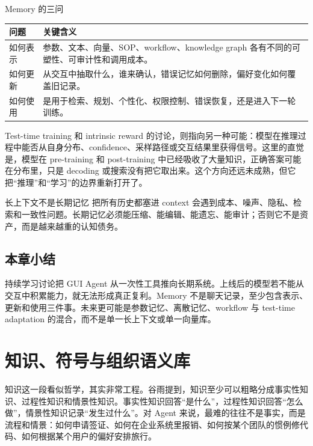 \documentclass[a4paper]{article}
\begin{document}
\begin{knowledgebox}{Memory 的三问}
\begin{tabularx}{\textwidth}{>{\raggedright\arraybackslash}p{} Y}
\toprule
问题 & 关键含义 \\
\midrule
如何表示 & 参数、文本、向量、SOP、workflow、knowledge graph 各有不同的可塑性、可审计性和调用成本。 \\
如何更新 & 从交互中抽取什么，谁来确认，错误记忆如何删除，偏好变化如何覆盖旧记录。 \\
如何使用 & 是用于检索、规划、个性化、权限控制、错误恢复，还是进入下一轮训练。 \\
\bottomrule
\end{tabularx}
\end{knowledgebox}

Test-time training 和 intrinsic reward 的讨论，则指向另一种可能：模型在推理过程中能否从自身分布、confidence、采样路径或交互结果里获得信号。这里的直觉是，模型在 pre-training 和 post-training 中已经吸收了大量知识，正确答案可能在分布里，只是 decoding 或搜索没有把它取出来。这个方向还远未成熟，但它把“推理”和“学习”的边界重新打开了。

\begin{warningbox}{长上下文不是长期记忆}
把所有历史都塞进 context 会遇到成本、噪声、隐私、检索和一致性问题。长期记忆必须能压缩、能编辑、能遗忘、能审计；否则它不是资产，而是越来越重的认知债务。
\end{warningbox}

\subsection{本章小结}

持续学习讨论把 GUI Agent 从一次性工具推向长期系统。上线后的模型若不能从交互中积累能力，就无法形成真正复利。Memory 不是聊天记录，至少包含表示、更新和使用三件事。未来更可能是参数记忆、离散记忆、workflow 与 test-time adaptation 的混合，而不是单一长上下文或单一向量库。

\section{知识、符号与组织语义库}

知识这一段看似哲学，其实非常工程。谷雨提到，知识至少可以粗略分成事实性知识、过程性知识和情景性知识。事实性知识回答“是什么”，过程性知识回答“怎么做”，情景性知识记录“发生过什么”。对 Agent 来说，最难的往往不是事实，而是流程和情景：如何申请签证、如何在企业系统里报销、如何按某个团队的惯例修代码、如何根据某个用户的偏好安排旅行。
\end{document}
